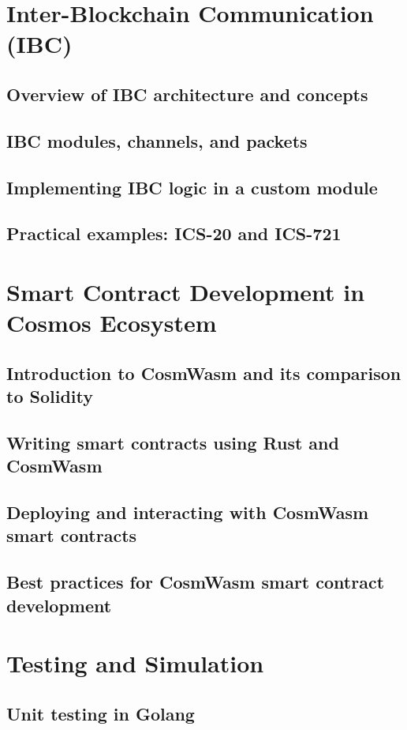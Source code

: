 \documentclass{article}
\begin{document}
\section{Inter-Blockchain Communication (IBC)}

\subsection{Overview of IBC architecture and concepts}
\subsection{IBC modules, channels, and packets}
\subsection{Implementing IBC logic in a custom module}
\subsection{Practical examples: ICS-20 and ICS-721}

\section{Smart Contract Development in Cosmos Ecosystem}

\subsection{Introduction to CosmWasm and its comparison to Solidity}
\subsection{Writing smart contracts using Rust and CosmWasm}
\subsection{Deploying and interacting with CosmWasm smart contracts}
\subsection{Best practices for CosmWasm smart contract development}

\section{Testing and Simulation}

\subsection{Unit testing in Golang}
\end{document}

